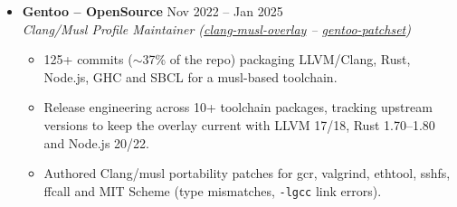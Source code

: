 \documentclass[12pt,a4paper]{article}
\begin{document}
\begin{itemize}[label=\tiny$\bullet$, leftmargin=1em, itemsep=6pt]
        \item \textbf{Gentoo -- OpenSource} \hfill {\color{textgrey} Nov 2022 -- Jan 2025} \\
        \textit{Clang/Musl Profile Maintainer (\href{https://github.com/clang-musl-overlay/clang-musl-overlay}{clang-musl-overlay} -- \href{https://github.com/clang-musl-overlay/gentoo-patchset}{gentoo-patchset})}
        \begin{itemize}[label=--, topsep=1pt]
            \item 125+ commits ($\sim$37\% of the
                repo) packaging LLVM/Clang, Rust, Node.js, GHC and SBCL for a musl-based
                toolchain.
            \item Release engineering across 10+ toolchain packages, tracking upstream
                versions to keep the overlay current with LLVM 17/18, Rust 1.70--1.80 and
                Node.js 20/22.
            \item Authored Clang/musl portability patches for
                gcr, valgrind, ethtool, sshfs, ffcall and MIT Scheme (type mismatches,
                \texttt{-lgcc} link errors).
        \end{itemize}
    \end{itemize}

\vspace{3pt}

\end{document}
